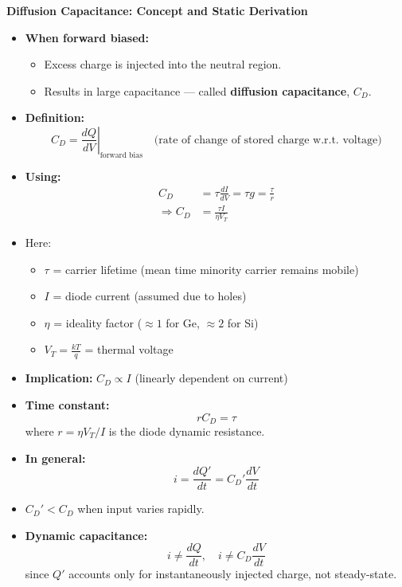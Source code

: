 \begin{frame}{\textbf{Diffusion Capacitance: Concept and Static Derivation}}
	\begin{itemize}
		\item \textbf{When forward biased:}
		\begin{itemize}
			\item Excess charge is injected into the neutral region.
			\item Results in large capacitance — called \textbf{diffusion capacitance}, $C_D$.
		\end{itemize}
		
		\item \textbf{Definition:}
		\[
		C_D = \left. \frac{dQ}{dV} \right|_{\text{forward bias}} \quad \text{(rate of change of stored charge w.r.t. voltage)}
		\]
	
		\item \textbf{Using:}
		\begin{align*}
			C_D &= \tau \frac{dI}{dV} = \tau g = \frac{\tau}{r} \tag{3-27} \\
			\Rightarrow C_D &= \frac{\tau I}{\eta V_T} \tag{3-28}
		\end{align*}
		\item Here:
		\begin{itemize}
			\item $\tau$ = carrier lifetime (mean time minority carrier remains mobile)
			\item $I$ = diode current (assumed due to holes)
			\item $\eta$ = ideality factor ($\approx 1$ for Ge, $\approx 2$ for Si)
			\item $V_T = \frac{kT}{q}$ = thermal voltage
		\end{itemize}
	\end{itemize}
	\end{frame}

		\begin{itemize}
			\item \textbf{Implication:} $C_D \propto I$ (linearly dependent on current)
	
			\item \textbf{Time constant:}
			\[
			r C_D = \tau \tag{3-29}
			\]
			where $r = \eta V_T / I$ is the diode dynamic resistance.
			\item \textbf{In general:}
			\[
			i = \frac{dQ'}{dt} = C_D' \frac{dV}{dt} \tag{3-30}
			\]
			\item $C_D' < C_D$ when input varies rapidly.
		
			\item \textbf{Dynamic capacitance:}
			\[
			i \neq \frac{dQ}{dt}, \quad i \neq C_D \frac{dV}{dt} \tag{3-31}
			\]
			since $Q'$ accounts only for instantaneously injected charge, not steady-state.
		\end{itemize}


